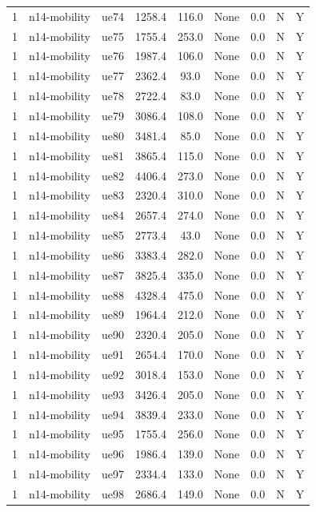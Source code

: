 \begin{table}[ht]
\begin{tabular}{|c|c|c|c|c|c|c|c|c|}
1 & n14-mobility & ue74 & 1258.4 & 116.0 & None & 0.0 & N & Y \\
1 & n14-mobility & ue75 & 1755.4 & 253.0 & None & 0.0 & N & Y \\
1 & n14-mobility & ue76 & 1987.4 & 106.0 & None & 0.0 & N & Y \\
1 & n14-mobility & ue77 & 2362.4 & 93.0 & None & 0.0 & N & Y \\
1 & n14-mobility & ue78 & 2722.4 & 83.0 & None & 0.0 & N & Y \\
1 & n14-mobility & ue79 & 3086.4 & 108.0 & None & 0.0 & N & Y \\
1 & n14-mobility & ue80 & 3481.4 & 85.0 & None & 0.0 & N & Y \\
1 & n14-mobility & ue81 & 3865.4 & 115.0 & None & 0.0 & N & Y \\
1 & n14-mobility & ue82 & 4406.4 & 273.0 & None & 0.0 & N & Y \\
1 & n14-mobility & ue83 & 2320.4 & 310.0 & None & 0.0 & N & Y \\
1 & n14-mobility & ue84 & 2657.4 & 274.0 & None & 0.0 & N & Y \\
1 & n14-mobility & ue85 & 2773.4 & 43.0 & None & 0.0 & N & Y \\
1 & n14-mobility & ue86 & 3383.4 & 282.0 & None & 0.0 & N & Y \\
1 & n14-mobility & ue87 & 3825.4 & 335.0 & None & 0.0 & N & Y \\
1 & n14-mobility & ue88 & 4328.4 & 475.0 & None & 0.0 & N & Y \\
1 & n14-mobility & ue89 & 1964.4 & 212.0 & None & 0.0 & N & Y \\
1 & n14-mobility & ue90 & 2320.4 & 205.0 & None & 0.0 & N & Y \\
1 & n14-mobility & ue91 & 2654.4 & 170.0 & None & 0.0 & N & Y \\
1 & n14-mobility & ue92 & 3018.4 & 153.0 & None & 0.0 & N & Y \\
1 & n14-mobility & ue93 & 3426.4 & 205.0 & None & 0.0 & N & Y \\
1 & n14-mobility & ue94 & 3839.4 & 233.0 & None & 0.0 & N & Y \\
1 & n14-mobility & ue95 & 1755.4 & 256.0 & None & 0.0 & N & Y \\
1 & n14-mobility & ue96 & 1986.4 & 139.0 & None & 0.0 & N & Y \\
1 & n14-mobility & ue97 & 2334.4 & 133.0 & None & 0.0 & N & Y \\
1 & n14-mobility & ue98 & 2686.4 & 149.0 & None & 0.0 & N & Y \\

\end{tabular}
\end{table}
